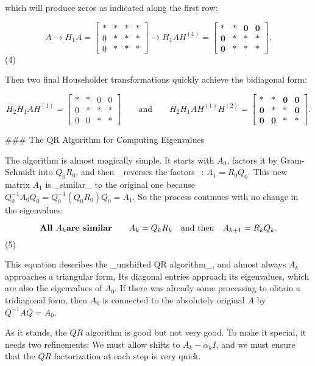which will produce zeros as indicated along the first row:

\[A\to H_{1}A=\begin{bmatrix}*&*&*&*\\ 0&*&*&*\\ 0&*&*&*\end{bmatrix}\to H_{1}AH^{(1)}=\begin{bmatrix}*&*&\mathbf{0}&\mathbf{0}\\ \mathbf{0}&*&*&*\\ \mathbf{0}&*&*&*\end{bmatrix}.\] (4)

Then two final Householder transformations quickly achieve the bidiagonal form:

\[H_{2}H_{1}AH^{(1)}=\begin{bmatrix}*&*&0&0\\ 0&*&*&*\\ 0&0&*&*\end{bmatrix}\qquad\text{and}\qquad H_{2}H_{1}AH^{(1)}H^{(2)}=\begin{bmatrix}*&*& \mathbf{0}&\mathbf{0}\\ \mathbf{0}&*&*&\mathbf{0}\\ \mathbf{0}&\mathbf{0}&*&*\end{bmatrix}.\]

### The QR Algorithm for Computing Eigenvalues

The algorithm is almost magically simple. It starts with \(A_{0}\), factors it by Gram-Schmidt into \(Q_{0}R_{0}\), and then _reverses the factors_: \(A_{1}=R_{0}Q_{0}\). This new matrix \(A_{1}\) is _similar_ to the original one because \(Q_{0}^{-1}A_{0}Q_{0}=Q_{0}^{-1}(Q_{0}R_{0})Q_{0}=A_{1}\). So the process continues with no change in the eigenvalues:

\[\text{\bf All }A_{k}\text{\bf are similar}\qquad A_{k}=Q_{k}R_{k}\quad\text{and then}\quad A_{k+1}=R_{k}Q_{k}.\] (5)

This equation describes the _unshifted QR algorithm_, and almost always \(A_{k}\) approaches a triangular form, Its diagonal entries approach its eigenvalues, which are also the eigenvalues of \(A_{0}\). If there was already some processing to obtain a tridiagonal form, then \(A_{0}\) is connected to the absolutely original \(A\) by \(Q^{-1}AQ=A_{0}\).

As it stands, the \(QR\) algorithm is good but not very good. To make it special, it needs two refinements: We must allow shifts to \(A_{k}-\alpha_{k}I\), and we must ensure that the \(QR\) factorization at each step is very quick.

